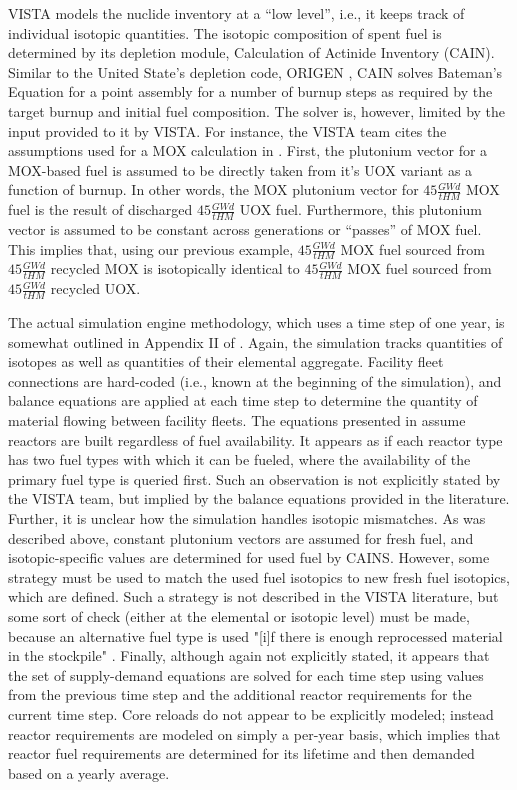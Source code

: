 VISTA models the nuclide inventory at a ``low level'', i.e., it keeps track of
individual isotopic quantities. The isotopic composition of spent fuel is
determined by its depletion module, Calculation of Actinide Inventory
(CAIN). Similar to the United State's depletion code, ORIGEN
\cite{bell_origen_1973}, CAIN solves Bateman's Equation for a point assembly for
a number of burnup steps as required by the target burnup and initial fuel
composition. The solver is, however, limited by the input provided to it by
VISTA. For instance, the VISTA team cites the assumptions used for a MOX
calculation in \cite{iaea_nuclear_2007}. First, the plutonium vector for a
MOX-based fuel is assumed to be directly taken from it's UOX variant as a
function of burnup. In other words, the MOX plutonium vector for $45 \frac{GW
  d}{tHM}$ MOX fuel is the result of discharged $45 \frac{GW d}{tHM}$ UOX
fuel. Furthermore, this plutonium vector is assumed to be constant across
generations or ``passes'' of MOX fuel. This implies that, using our previous
example, $45 \frac{GW d}{tHM}$ MOX fuel sourced from $45 \frac{GW d}{tHM}$
recycled MOX is isotopically identical to $45 \frac{GW d}{tHM}$ MOX fuel sourced
from $45 \frac{GW d}{tHM}$ recycled UOX.

The actual simulation engine methodology, which uses a time step of one year, is
somewhat outlined in Appendix II of \cite{iaea_nuclear_2007}. Again, the
simulation tracks quantities of isotopes as well as quantities of their
elemental aggregate. Facility fleet connections are hard-coded (i.e., known at
the beginning of the simulation), and balance equations are applied at each time
step to determine the quantity of material flowing between facility fleets. The
equations presented in \cite{iaea_nuclear_2007} assume reactors are built
regardless of fuel availability. It appears as if each reactor type has two fuel
types with which it can be fueled, where the availability of the primary fuel
type is queried first. Such an observation is not explicitly stated by the VISTA
team, but implied by the balance equations provided in the literature. Further,
it is unclear how the simulation handles isotopic mismatches. As was described
above, constant plutonium vectors are assumed for fresh fuel, and
isotopic-specific values are determined for used fuel by CAINS. However, some
strategy must be used to match the used fuel isotopics to new fresh fuel
isotopics, which are defined. Such a strategy is not described in the VISTA
literature, but some sort of check (either at the elemental or isotopic level)
must be made, because an alternative fuel type is used "[i]f there is enough
reprocessed material in the stockpile" \cite{iaea_nuclear_2007}. Finally,
although again not explicitly stated, it appears that the set of supply-demand
equations are solved for each time step using values from the previous time step
and the additional reactor requirements for the current time step. Core reloads
do not appear to be explicitly modeled; instead reactor requirements are modeled
on simply a per-year basis, which implies that reactor fuel requirements are
determined for its lifetime and then demanded based on a yearly average.

